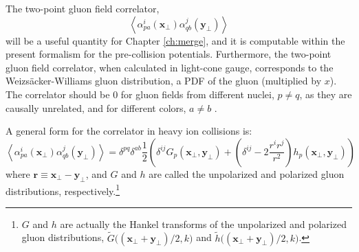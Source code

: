 
The two-point gluon field correlator, 
\begin{equation}
	\left< \alpha^i_{pa} (\mathbf{x}_\perp) \alpha^j_{qb} (\mathbf{y}_\perp) \right>
\end{equation}
will be a useful quantity for Chapter \ref{ch:merge}, and it is computable within the present formalism for the pre-collision potentials. Furthermore, the two-point gluon field correlator, when calculated in light-cone gauge, corresponds to the Weizsäcker-Williams gluon distribution, a \gls{PDF} of the gluon (multiplied by $x$). The correlator should be $0$ for gluon fields from different nuclei, $p \neq q$, as they are causally unrelated, and for different colors, $a \neq b$ \cite{Lappi:2017skr}.


A general form for the correlator in heavy ion collisions is: \cite{Lappi:2017skr}
\begin{equation}
	\left< \alpha^i_{pa} (\mathbf{x}_\perp) \alpha^j_{qb} (\mathbf{y}_\perp) \right> = 
	 \delta^{pq}\delta^{ab} \frac{1}{2}
	\left( \delta^{ij} G_p (\mathbf{x}_\perp,\mathbf{y}_\perp) + \left(\delta^{ij} - 2 \frac{r^i r^j}{r^2} \right) h_p (\mathbf{x}_\perp,\mathbf{y}_\perp) \right)
\label{eq:general_correlator}
\end{equation}
where $\mathbf{r} \equiv \mathbf{x}_\perp - \mathbf{y}_\perp$, and $G$ and $h$ are called the unpolarized and polarized gluon distributions, respectively.\footnote{$G$ and $h$ are actually the Hankel transforms of the unpolarized and polarized gluon distributions, $\tilde{G}\big((\mathbf{x}_\perp + \mathbf{y}_\perp)/2,k\big)$  and $\tilde{h}\big((\mathbf{x}_\perp + \mathbf{y}_\perp)/2,k\big)$.}

